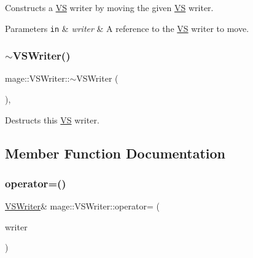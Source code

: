 Constructs a \hyperlink{structmage_1_1_v_s}{VS} writer by moving the given \hyperlink{structmage_1_1_v_s}{VS} writer.


\begin{DoxyParams}[1]{Parameters}
\mbox{\tt in}  & {\em writer} & A reference to the \hyperlink{structmage_1_1_v_s}{VS} writer to move. \\
\hline
\end{DoxyParams}
\hypertarget{classmage_1_1_v_s_writer_aa15508560fbef2ef742beb1ff0d96d19}{}\label{classmage_1_1_v_s_writer_aa15508560fbef2ef742beb1ff0d96d19} 
\subsubsection{\texorpdfstring{$\sim$\+V\+S\+Writer()}{~VSWriter()}}
{\footnotesize\ttfamily mage\+::\+V\+S\+Writer\+::$\sim$\+V\+S\+Writer (\begin{DoxyParamCaption}{ }\end{DoxyParamCaption})\hspace{0.3cm}{\ttfamily [virtual]}, {\ttfamily [default]}}

Destructs this \hyperlink{structmage_1_1_v_s}{VS} writer. 

\subsection{Member Function Documentation}
\hypertarget{classmage_1_1_v_s_writer_af943d317ae357723a08b2bbf2bab23ba}{}\label{classmage_1_1_v_s_writer_af943d317ae357723a08b2bbf2bab23ba} 
\subsubsection{\texorpdfstring{operator=()}{operator=()}\hspace{0.1cm}{\footnotesize\ttfamily [1/2]}}
{\footnotesize\ttfamily \hyperlink{classmage_1_1_v_s_writer}{V\+S\+Writer}\& mage\+::\+V\+S\+Writer\+::operator= (\begin{DoxyParamCaption}\item[{const \hyperlink{classmage_1_1_v_s_writer}{V\+S\+Writer} \&}]{writer }\end{DoxyParamCaption})\hspace{0.3cm}{\ttfamily [delete]}}

